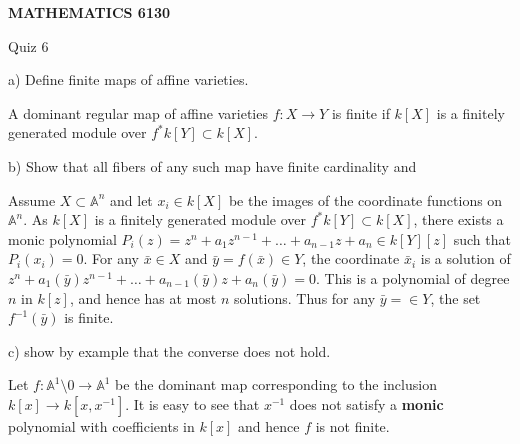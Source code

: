 \documentclass[12pt]{amsart}
\begin{document}
\bigskip\bigskip\bigskip\bigskip
\centerline{\bf MATHEMATICS 6130}
\centerline{Quiz 6}
a) Define finite maps of affine varieties. 

A dominant regular map of affine varieties $f:X\to Y$ is finite if $k[X]$ is a finitely generated module over $f^*k[Y]\subset k[X]$.

b) Show that all fibers of any such map have finite cardinality and 

Assume $X\subset \mathbb A ^n$ and let $x_i\in k[X]$ be the images of the coordinate functions on $\mathbb A ^n$. 
As $k[X]$ is a finitely generated module over $f^*k[Y]\subset k[X]$, there exists a monic polynomial $P_i(z)=z^n+a_1z^{n-1}+\ldots +a_{n-1}z+a_n\in k[Y][z]$ such that 
$P_i(x_i)=0$. For any $\bar x\in X$ and $\bar y=f(\bar x)\in Y$, the coordinate $\bar x _i$ is a solution of $z^n+a_1(\bar y)z^{n-1}+\ldots +a_{n-1}(\bar y)z+a_n(\bar y)=0$. This is a polynomial of degree $n$ in $k[z]$, and hence has at most $n$ solutions. Thus for any $\bar y=\in Y$, the set $f^{-1}(\bar y)$ is finite.

c) show by example that the converse does not hold.

Let $f:\mathbb A ^1\setminus 0\to \mathbb A ^1$ be the dominant map corresponding to the inclusion $k[x]\to k[x,x^{-1}]$. It is easy to see that $x^{-1}$ does not satisfy a {\bf monic} polynomial with coefficients in $k[x]$ and hence 
$f$ is not finite.
\end{document}
